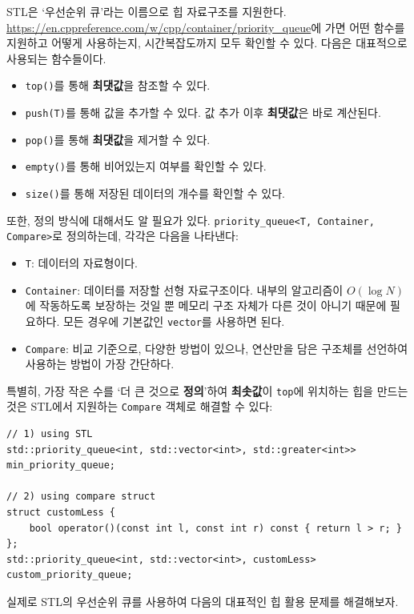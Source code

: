 STL은 `우선순위 큐'라는 이름으로 힙 자료구조를 지원한다. \url{https://en.cppreference.com/w/cpp/container/priority_queue}에 가면 어떤 함수를 지원하고 어떻게 사용하는지, 시간복잡도까지 모두 확인할 수 있다. 다음은 대표적으로 사용되는 함수들이다.

\begin{itemize}
    \item \texttt{top()}를 통해 \textbf{최댓값}을 참조할 수 있다.
    \item \texttt{push(T)}를 통해 값을 추가할 수 있다. 값 추가 이후 \textbf{최댓값}은 바로 계산된다.
    \item \texttt{pop()}를 통해 \textbf{최댓값}을 제거할 수 있다.
    \item \texttt{empty()}를 통해 비어있는지 여부를 확인할 수 있다.
    \item \texttt{size()}를 통해 저장된 데이터의 개수를 확인할 수 있다.
\end{itemize}

또한, 정의 방식에 대해서도 알 필요가 있다. \texttt{priority\_queue<T, Container, Compare>}로 정의하는데, 각각은 다음을 나타낸다:

\begin{itemize}
    \item \texttt{T}: 데이터의 자료형이다.
    \item \texttt{Container}: 데이터를 저장할 선형 자료구조이다. 내부의 알고리즘이 $O(\log N)$에 작동하도록 보장하는 것일 뿐 메모리 구조 자체가 다른 것이 아니기 때문에 필요하다. 모든 경우에 기본값인 \texttt{vector}를 사용하면 된다.
    \item \texttt{Compare}: 비교 기준으로, 다양한 방법이 있으나, 연산만을 담은 구조체를 선언하여 사용하는 방법이 가장 간단하다.
\end{itemize}

특별히, 가장 작은 수를 `더 큰 것으로 \textbf{정의}'하여 \textbf{최솟값}이 \texttt{top}에 위치하는 힙을 만드는 것은 STL에서 지원하는 \texttt{Compare} 객체로 해결할 수 있다:

\begin{lstlisting}
// 1) using STL
std::priority_queue<int, std::vector<int>, std::greater<int>> min_priority_queue;

// 2) using compare struct
struct customLess {
    bool operator()(const int l, const int r) const { return l > r; }
};
std::priority_queue<int, std::vector<int>, customLess> custom_priority_queue;
\end{lstlisting}

실제로 STL의 우선순위 큐를 사용하여 다음의 대표적인 힙 활용 문제를 해결해보자.


